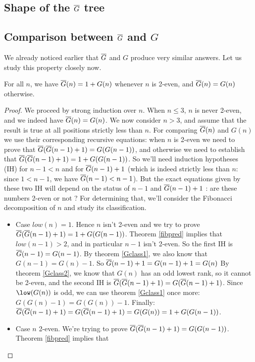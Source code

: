 \documentclass[a4paper,11pt]{article}
\begin{document}
\subsection*{Shape of the $\overline{G}$ tree}

\subsection*{Comparison between $\overline{G}$ and $G$}

We already noticed earlier that $\overline{G}$ and $G$ produce very similar
answers. Let us study this property closely now.

\begin{theorem}\label{comp-fg-g}
For all $n$, we have $\overline{G}(n)=1+G(n)$ whenever $n$ is 2-even,
and $\overline{G}(n)=G(n)$ otherwise.
\end{theorem}
\begin{proof}
We proceed by strong induction over $n$.
When $n\le 3$, $n$ is never 2-even, and we indeed have
$\overline{G}(n)=G(n)$. We now consider $n>3$, and assume that
the result is true at all positions strictly less than $n$.
For comparing $\overline{G}(n)$ and $G(n)$ we use their corresponding
recursive equations: when $n$ is 2-even we need to prove that
$\overline{G}(\overline{G}(n-1)+1)=G(G(n-1))$, and otherwise we need to establish
that $\overline{G}(\overline{G}(n-1)+1)=1+G(G(n-1))$. So we'll need
induction hypotheses (IH) for $n-1<n$ and for $\overline{G}(n-1)+1$
(which is indeed strictly less than $n$:
since $1<n-1$, we have $\overline{G}(n-1)<n-1$). But the exact equations
given by these two IH will depend on the
status of $n-1$ and $\overline{G}(n-1)+1$ : are these numbers 2-even or not ?
For determining that, we'll consider the Fibonacci decomposition
of $n$ and study its classification.
\begin{itemize}
\item Case $low(n)=1$. Hence $n$ isn't 2-even and we try to prove
  $\overline{G}(\overline{G}(n-1)+1)=1+G(G(n-1))$. Theorem \ref{fibpred} implies that
  $low(n-1)>2$, and in particular $n-1$ isn't 2-even.
  So the first IH is $\overline{G}(n-1)=G(n-1)$. By theorem
  \ref{Gclass1}, we also know that $G(n-1)=G(n)-1$.
  So $\overline{G}(n-1)+1=G(n-1)+1=G(n)$
  By theorem \ref{Gclass2}, we know that $G(n)$ has an odd lowest
  rank, so it cannot be 2-even, and the second IH is
  $\overline{G}(\overline{G}(n-1)+1)=G(\overline{G}(n-1)+1)$.
  Since $\low(G(n))$ is odd, we can use theorem \ref{Gclass1} once
  more: $G(G(n)-1) = G(G(n))-1$.
  Finally: $\overline{G}(\overline{G}(n-1)+1)=G(\overline{G}(n-1)+1)=G(G(n))=1+G(G(n-1))$.
\item Case $n$ 2-even. We're trying to prove
  $\overline{G}(\overline{G}(n-1)+1)=G(G(n-1))$. Theorem \ref{fibpred} implies that

\end{itemize}
\end{proof}
\end{document}
